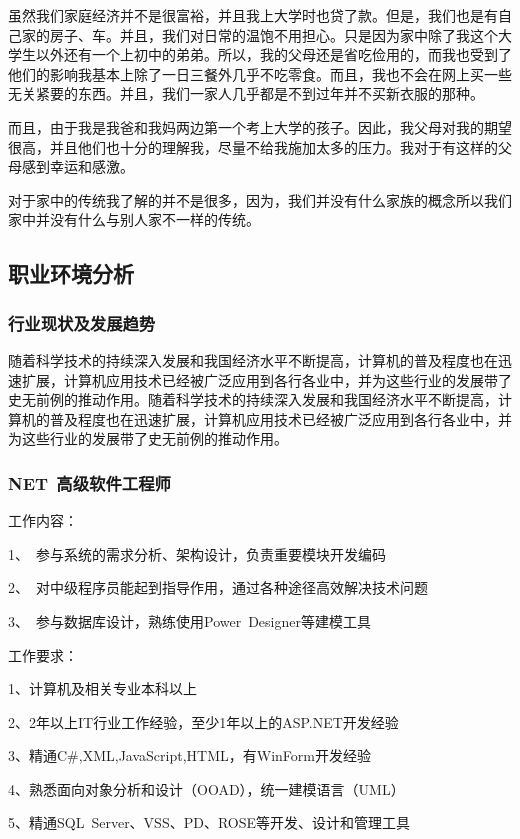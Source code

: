 \documentclass{article}
\begin{document}
    虽然我们家庭经济并不是很富裕，并且我上大学时也贷了款。但是，我们也是有自己家的房子、车。并且，我们对日常的温饱不用担心。只是因为家中除了我这个大学生以外还有一个上初中的弟弟。所以，我的父母还是省吃俭用的，而我也受到了他们的影响我基本上除了一日三餐外几乎不吃零食。而且，我也不会在网上买一些无关紧要的东西。并且，我们一家人几乎都是不到过年并不买新衣服的那种。

    而且，由于我是我爸和我妈两边第一个考上大学的孩子。因此，我父母对我的期望很高，并且他们也十分的理解我，尽量不给我施加太多的压力。我对于有这样的父母感到幸运和感激。

    对于家中的传统我了解的并不是很多，因为，我们并没有什么家族的概念所以我们家中并没有什么与别人家不一样的传统。\par
\subsection{职业环境分析}
	\subsubsection{ 行业现状及发展趋势}

随着科学技术的持续深入发展和我国经济水平不断提高，计算机的普及程度也在迅速扩展，计算机应用技术已经被广泛应用到各行各业中，并为这些行业的发展带了史无前例的推动作用。随着科学技术的持续深入发展和我国经济水平不断提高，计算机的普及程度也在迅速扩展，计算机应用技术已经被广泛应用到各行各业中，并为这些行业的发展带了史无前例的推动作用。
	\subsubsection{ NET 高级软件工程师 }

工作内容：

          1、 参与系统的需求分析、架构设计，负责重要模块开发编码 

          2、 对中级程序员能起到指导作用，通过各种途径高效解决技术问题 

          3、 参与数据库设计，熟练使用Power Designer等建模工具

工作要求：

          1、计算机及相关专业本科以上 

          2、2年以上IT行业工作经验，至少1年以上的ASP.NET开发经验 

          3、精通C\#,XML,JavaScript,HTML，有WinForm开发经验 

          4、熟悉面向对象分析和设计（OOAD），统一建模语言（UML） 

          5、精通SQL Server、VSS、PD、ROSE等开发、设计和管理工具
\end{document}
